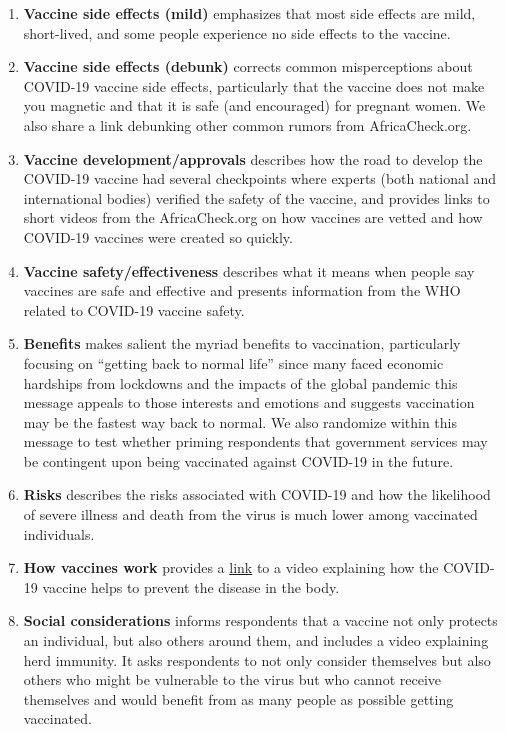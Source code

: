 \documentclass[letterpaper, 12pt, parskip=full,DIV=10]{scrartcl}
\begin{document}
\begin{enumerate}
  \item \textbf{Vaccine side effects (mild)} emphasizes that most side effects are mild, short-lived, and some people experience no side effects to the vaccine. 
  \item \textbf{Vaccine side effects (debunk)} corrects common misperceptions about COVID-19 vaccine side effects, particularly that the vaccine does not make you magnetic and that it is safe (and encouraged) for pregnant women. We also share a link debunking other common rumors from AfricaCheck.org.
  \item \textbf{Vaccine development/approvals} describes how the road to develop the COVID-19 vaccine had several checkpoints where experts (both national and international bodies) verified the safety of the vaccine, and provides links to short videos from the AfricaCheck.org on how vaccines are vetted and how COVID-19 vaccines were created so quickly. 
  \item \textbf{Vaccine safety/effectiveness} describes what it means when people say vaccines are safe and effective and presents information from the WHO related to COVID-19 vaccine safety.
  \item \textbf{Benefits} makes salient the myriad benefits to vaccination, particularly focusing on ``getting back to normal life'' since many faced economic hardships from lockdowns and the impacts of the global pandemic this message appeals to those interests and emotions and suggests vaccination may be the fastest way back to normal. We also randomize within this message to test whether priming respondents that government services may be contingent upon being vaccinated against COVID-19 in the future.
  \item \textbf{Risks} describes the risks associated with COVID-19 and how the likelihood of severe illness and death from the virus is much lower among vaccinated individuals.
  \item \textbf{How vaccines work} provides a \href{https://www.facebook.com/dataforsociety/videos/4265014093602814}{link} to a video explaining how the COVID-19 vaccine helps to prevent the disease in the body. 
  \item \textbf{Social considerations} informs respondents that a vaccine not only protects an individual, but also others around them, and includes a video explaining herd immunity. It asks respondents to not only consider themselves but also others who might be vulnerable to the virus but who cannot receive themselves and would benefit from as many people as possible getting vaccinated.

\end{enumerate}
\end{document}
